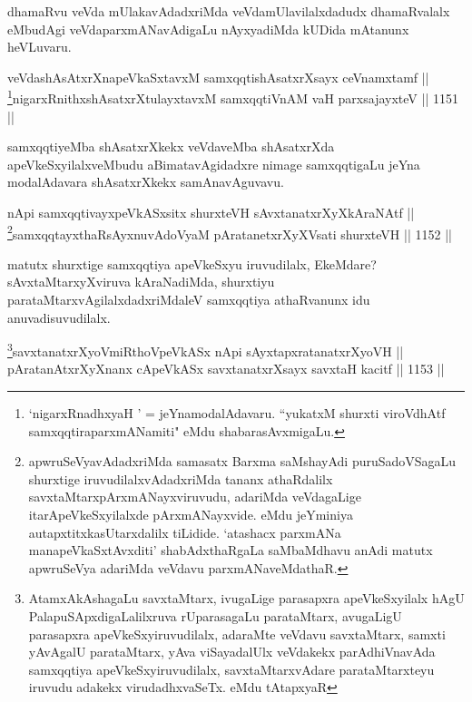 \begin{artha}
dhamaRvu veVda mUlakavAdadxriMda veVdamUlavilalxdadudx dhamaRvalalx eMbudAgi veVdaparxmANavAdigaLu nAyxyadiMda kUDida mAtanunx heVLuvaru.
\end{artha}


\begin{shl}
veVdashAsAtxrXnapeVkaSxtavxM samxqqtishAsatxrXsayx ceVnamxtamf ||  \\
\footnote{`nigarxRnadhxyaH ' = jeYnamodalAdavaru. ``yukatxM shurxti viroVdhAtf samxqqtiraparxmANamiti" eMdu shabarasAvxmigaLu.}nigarxRnithxshAsatxrXtulayxtavxM samxqqtiVnAM vaH parxsajayxteV \hfill || 1151 ||  
\end{shl}


\begin{artha}
samxqqtiyeMba shAsatxrXkekx veVdaveMba shAsatxrXda apeVkeSxyilalxveMbudu aBimatavAgidadxre nimage samxqqtigaLu jeYna modalAdavara shAsatxrXkekx samAnavAguvavu.
\end{artha}


\begin{shl}
nApi samxqqtivayxpeVkASx\s sitx shurxteVH sAvxtanatxrXyXkAraNAtf || \\
\footnote{apwruSeVyavAdadxriMda samasatx Barxma saMshayAdi puruSadoVSagaLu shurxtige iruvudilalxvAdadxriMda tananx athaRdalilx savxtaMtarxpArxmANayxviruvudu, adariMda veVdagaLige itarApeVkeSxyilalxde pArxmANayxvide. eMdu jeYminiya autapxtitxkasUtarxdalilx tiLidide. `atashacx parxmANa manapeVkaSxtAvxditi' shabAdxthaRgaLa saMbaMdhavu anAdi matutx apwruSeVya adariMda veVdavu parxmANaveMdathaR.}samxqqtayxthaRsAyxnuvAdoV\s yaM pAratanetxrXyXV\s sati shurxteVH \hfill || 1152 ||  
\end{shl}


\begin{artha}
matutx shurxtige samxqqtiya apeVkeSxyu iruvudilalx, EkeMdare? sAvxtaMtarxyXviruva kAraNadiMda, shurxtiyu parataMtarxvAgilalxdadxriMdaleV samxqqtiya athaRvanunx idu anuvadisuvudilalx.
\end{artha}

\begin{shl}
\footnote{AtamxAkAshagaLu savxtaMtarx, ivugaLige parasapxra apeVkeSxyilalx hAgU PalapuSApxdigaLalilxruva rUparasagaLu parataMtarx, avugaLigU parasapxra apeVkeSxyiruvudilalx, adaraMte veVdavu savxtaMtarx, samxti yAvAgalU parataMtarx, yAva viSayadalUlx veVdakekx parAdhiVnavAda samxqqtiya apeVkeSxyiruvudilalx, savxtaMtarxvAdare parataMtarxteyu iruvudu adakekx virudadhxvaSeTx. eMdu tAtapxyaR}savxtanatxrXyoVmiRthoV\s peVkASx nApi sAyxtapxratanatxrXyoVH || \\
pAratanAtxrXyXnanx cApeVkASx savxtanatxrXsayx savxtaH kacitf \hfill || 1153 ||  
\end{shl}


